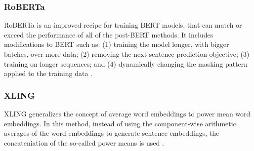 \subsubsection{RoBERTa}
RoBERTa is an improved recipe for training BERT models, that can match or exceed the performance of all of the post-BERT methods. It includes modifications to BERT such as: (1) training the model longer, with bigger batches, over more data; (2) removing the next sentence prediction objective; (3) training on longer sequences; and (4) dynamically changing the masking pattern applied to the training data \cite{liu2019roberta}.

\subsubsection{XLING}
XLING generalizes  the  concept  of  average  word  embeddings to power mean word embeddings. In this method, instead of using the component-wise arithmetic averages of the word embeddings to generate sentence embeddings, the concateniation of the so-called power means is used \cite{rckl2018concatenated}.

